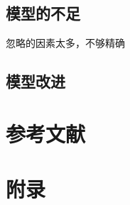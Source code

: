 \documentclass[UTF8]{ctexart}
\begin{document}
	\subsection{模型的不足}
	忽略的因素太多，不够精确
	\subsection{模型改进}
	
	\section{参考文献}
	
	\section{附录}
	\begin{appendices}
		
	\end{appendices}
	
\end{document}
